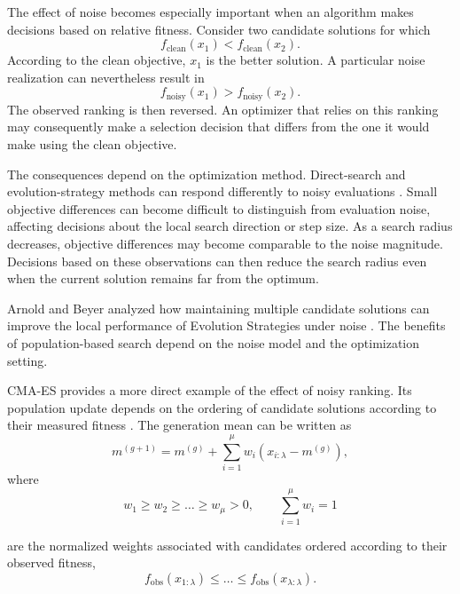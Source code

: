 The effect of noise becomes especially important when an algorithm makes
decisions based on relative fitness. Consider two candidate solutions for
which
\begin{equation}
    f_{\text{clean}}(x_1) < f_{\text{clean}}(x_2).
\end{equation}
According to the clean objective, $x_1$ is the better solution. A particular
noise realization can nevertheless result in
\begin{equation}
    f_{\text{noisy}}(x_1) > f_{\text{noisy}}(x_2).
\end{equation}
The observed ranking is then reversed. An optimizer that relies on this
ranking may consequently make a selection decision that differs from the one
it would make using the clean objective.

The consequences depend on the optimization method. Direct-search and
evolution-strategy methods can respond differently to noisy evaluations
\cite{ArnoldB03,Arnold2003}. Small objective differences can become difficult
to distinguish from evaluation noise, affecting decisions about the local
search direction or step size. As a search radius decreases, objective
differences may become comparable to the noise magnitude. Decisions based
on these observations can then reduce the search radius even when the
current solution remains far from the optimum.

Arnold and Beyer analyzed how maintaining multiple candidate solutions can
improve the local performance of Evolution Strategies under noise
\cite{Arnold2003}. The benefits of population-based search depend on the
noise model and the optimization setting.

CMA-ES provides a more direct example of the effect of noisy ranking. Its
population update depends on the ordering of candidate solutions according
to their measured fitness \cite{Hansen2001}. The generation mean can be
written as
\begin{equation}
\label{eq:cma_mean_update_bg}
    m^{(g+1)} =
    m^{(g)} +
    \sum_{i=1}^{\mu}
    w_i
    \left(
        x_{i:\lambda}-m^{(g)}
    \right),
\end{equation}
where
\begin{equation}
    w_1 \geq w_2 \geq \dots \geq w_\mu > 0,
    \qquad
    \sum_{i=1}^{\mu}w_i=1
\end{equation}

are the normalized weights associated with candidates
ordered according to their observed fitness,
\begin{equation}
    f_{\mathrm{obs}}(x_{1:\lambda})
    \leq \dots \leq
    f_{\mathrm{obs}}(x_{\lambda:\lambda}).
\end{equation}

